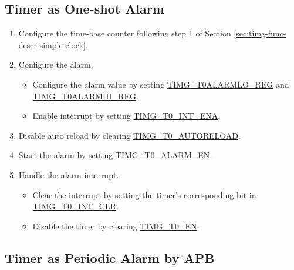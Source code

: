 \documentclass[main\_\_EN.tex]{subfiles}
\begin{document}
\subsection{Timer as One-shot Alarm}\label{sec:timg-func-descr-timer-alarm}

\begin{enumerate}
    \item Configure the time-base counter following step 1 of Section \ref{sec:timg-func-descr-simple-clock}.
    \item Configure the alarm.
    \begin{itemize}
        \item Configure the alarm value by setting \hyperref[regdesc:TIMGTXALARMLOREG]{TIMG\_T0ALARMLO\_REG} and \hyperref[regdesc:TIMGTXALARMHIREG]{TIMG\_T0ALARMHI\_REG}.
        \item Enable interrupt by setting  \hyperref[fielddesc:TIMGT0INTENA]{TIMG\_T0\_INT\_ENA}.
    \end{itemize}
    \item Disable auto reload by clearing \hyperref[fielddesc:TIMGTXAUTORELOAD]{TIMG\_T0\_AUTORELOAD}.
    \item Start the alarm by setting \hyperref[fielddesc:TIMGTXALARMEN]{TIMG\_T0\_ALARM\_EN}.
    \item Handle the alarm interrupt.
    \begin{itemize}
        \item Clear the interrupt by setting the timer's corresponding bit in \hyperref[fielddesc:TIMGT0INTCLR]{TIMG\_T0\_INT\_CLR}.
        \item Disable the timer by clearing \hyperref[fielddesc:TIMGTXEN]{TIMG\_T0\_EN}.
    \end{itemize}
\end{enumerate}

\subsection{Timer as Periodic Alarm by APB}
\end{document}
